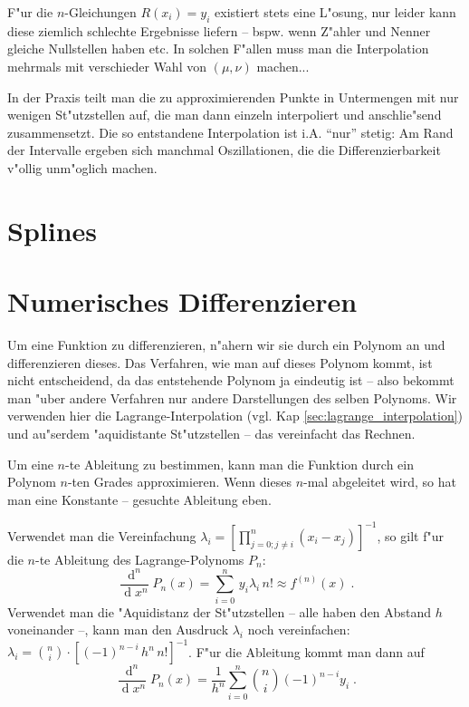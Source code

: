 \documentclass[a4paper]{book}
\newcommand{\abs}{\bigskip \noindent}
\newcommand{\diff}{\ensuremath{\operatorname d}}
\begin{document}
F"ur die $n$-Gleichungen $R(x_i) = y_i$ existiert stets eine L"osung,
nur leider kann diese ziemlich schlechte Ergebnisse liefern --
bspw. wenn Z"ahler und Nenner gleiche Nullstellen haben etc. In
solchen F"allen muss man die Interpolation mehrmals mit verschieder
Wahl von $(\mu,\nu)$ machen...

In der Praxis teilt man die zu approximierenden Punkte in Untermengen
mit nur wenigen St"utzstellen auf, die man dann einzeln interpoliert
und anschlie"send zusammensetzt. Die so entstandene Interpolation ist
i.A. "`nur"' stetig: Am Rand der Intervalle ergeben sich manchmal
Oszillationen, die die Differenzierbarkeit v"ollig unm"oglich machen.




\section{Splines}
\label{sec:splines}







\section{Numerisches Differenzieren}
\label{sec:numerisches_differenzieren}


Um eine Funktion zu differenzieren, n"ahern wir sie durch ein Polynom
an und differenzieren dieses. Das Verfahren, wie man auf dieses
Polynom kommt, ist nicht entscheidend, da das entstehende Polynom ja
eindeutig ist -- also bekommt man "uber andere Verfahren nur andere
Darstellungen des selben Polynoms.  Wir verwenden hier die
Lagrange-Interpolation (vgl. Kap \ref{sec:lagrange_interpolation}) und
au"serdem "aquidistante St"utzstellen -- das vereinfacht das Rechnen.

\abs
Um eine $n$-te Ableitung zu bestimmen, kann man die Funktion durch ein
Polynom $n$-ten Grades approximieren. Wenn dieses $n$-mal abgeleitet
wird, so hat man eine Konstante -- gesuchte Ableitung eben.

Verwendet man die Vereinfachung $\lambda_i = \left [ \prod_{j = 0; j \neq
  i}^n (x_i - x_j) \right ]^{-1}$, so gilt f"ur die $n$-te Ableitung
des Lagrange-Polynoms $P_n$:
\begin{equation}
  \label{eq:38}
  \frac{\diff ^n}{\diff x^n} P_n(x) = \sum_{i = 0}^n \, y_i \lambda_i
  \, n! \approx f^{(n)}(x) \;.
\end{equation}
Verwendet man die "Aquidistanz der St"utzstellen -- alle haben den
Abstand $h$ voneinander --, kann man den
Ausdruck $\lambda_i$ noch vereinfachen: $\lambda_i = \binom{n}{i}
\cdot \left [ (-1)^{n-i} \, h^n \, n! \right ]^{-1}$. F"ur die
Ableitung kommt man dann auf
\begin{equation}
  \label{eq:39}
  \frac{\diff ^n}{\diff x^n}P_n(x) = 
  \frac{1}{h^n}\sum_{i=0}^n \binom n i (-1)^{n-i}y_i 
\;.
\end{equation}
\end{document}
